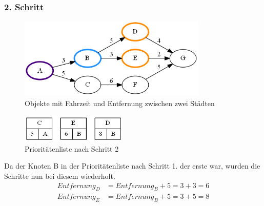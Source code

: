 \documentclass[11pt]{scrreprt}
\begin{document}
			\newpage
			\subsubsection{2. Schritt}
			\begin{figure}[ht]
				\centering
				\includegraphics[width=0.8\textwidth]{Graphs/Example2}
				\caption{Objekte mit Fahrzeit und Entfernung zwischen zwei Städten}
			\end{figure}
			\begin{figure}[ht]
				\centering
				\includegraphics[width=0.45\textwidth]{Graphs/Example2_PQ}
				\caption{Prioritätenliste nach Schritt 2}
			\end{figure}
			\FloatBarrier
			Da der Knoten B in der Prioritätenliste nach Schritt 1. der erste war, wurden die Schritte nun bei diesem wiederholt.
			\begin{align*}
			Entfernung_D &= Entfernung_B + 5 = 3 + 3 = 6\\
			Entfernung_E &= Entfernung_B + 5 = 3 + 5 = 8
			\end{align*}
			
			\newpage
\end{document}

